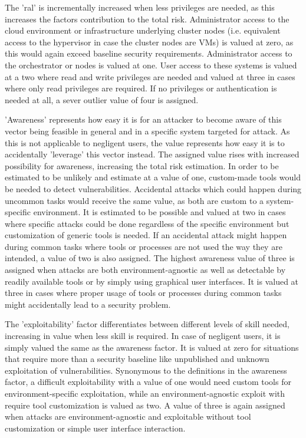 The '\gls{ral}' is incrementally increased when less privileges are needed, as this increases the factors contribution to the total risk.
Administrator access to the cloud environment or infrastructure underlying cluster nodes (i.e. equivalent access to the hypervisor in case the cluster nodes are VMs) is valued at zero, as this would again exceed baseline security requirements. Administrator access to the orchestrator or nodes is valued at one. User access to these systems is valued at a two where read and write privileges are needed and valued at three in cases where only read privileges are required. If no privileges or authentication is needed at all, a sever outlier value of four is assigned.

'Awareness' represents how easy it is for an attacker to become aware of this vector being feasible in general and in a specific system targeted for attack. As this is not applicable to negligent users, the value represents how easy it is to accidentally 'leverage' this vector instead. The assigned value rises with increased possibility for awareness, increasing the total risk estimation.
In order to be estimated to be unlikely and estimate at a value of one, custom-made tools would be needed to detect vulnerabilities. Accidental attacks which could happen during uncommon tasks would receive the same value, as both are custom to a system-specific environment. It is estimated to be possible and valued at two in cases where specific attacks could be done regardless of the specific environment but customization of generic tools is needed. If an accidental attack might happen during common tasks where tools or processes are not used the way they are intended, a value of two is also assigned.
The highest awareness value of three is assigned when attacks are both environment-agnostic as well as detectable by readily available tools or by simply using graphical user interfaces. It is valued at three in cases where proper usage of tools or processes during common tasks might accidentally lead to a security problem.

\newpage
The 'exploitability' factor differentiates between different levels of skill needed, increasing in value when less skill is required. In case of negligent users, it is simply valued the same as the awareness factor. It is valued at zero for situations that require more than a security baseline like unpublished and unknown exploitation of vulnerabilities. Synonymous to the definitions in the awareness factor, a difficult exploitability with a value of one would need custom tools for environment-specific exploitation, while an environment-agnostic exploit with require tool customization is valued as two. A value of three is again assigned when attacks are environment-agnostic and exploitable without tool customization or simple user interface interaction.

